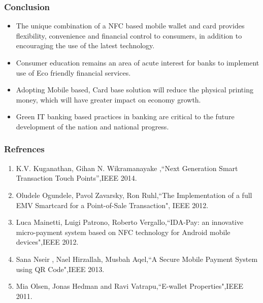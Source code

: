 \documentclass[handout]{beamer}
\begin{document}
\begin{frame}
\frametitle{Conclusion}
\begin{itemize}

\item The unique combination of a NFC based mobile wallet and card provides flexibility, convenience and financial control to consumers, in addition to encouraging the use of the latest technology.
\item Consumer education remains an area of acute interest for banks to implement use of Eco friendly financial services.
\item Adopting Mobile based, Card base solution will reduce the physical printing money, which will have greater impact on economy growth.
\item Green IT banking based practices in banking are critical to the future development of the nation and national progress.




\end{itemize}
\end{frame}

\begin{frame}
\frametitle{Refrences}
\begin{enumerate}
\item  K.V. Kuganathan, Gihan N. Wikramanayake ,``Next Generation Smart Transaction Touch Points'',IEEE 2014.\\
\item  Oludele Ogundele, Pavol Zavarsky, Ron Ruhl,``The Implementation of a full EMV Smartcard for a Point-of-Sale Transaction", IEEE 2012.\\
\item Luca Mainetti, Luigi Patrono, Roberto Vergallo,``IDA-Pay: an innovative micro-payment system based on NFC technology for Android mobile devices",IEEE 2012.\\ 
\item Sana Nseir , Nael Hirzallah, Musbah Aqel,``A Secure Mobile Payment System using QR Code",IEEE 2013. \\
\item Mia Olsen, Jonas Hedman and Ravi Vatrapu,``E-wallet Properties",IEEE 2011.\\

\end{enumerate}

\end{frame}
\end{document}
